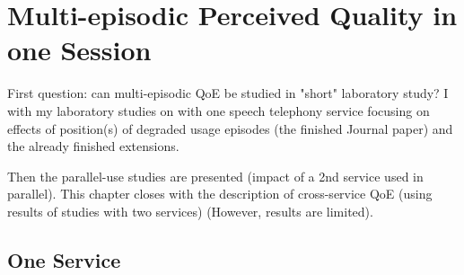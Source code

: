 \chapter{Multi-episodic Perceived Quality in one Session}\label{chap:lab}
\begin{chapter-abstract}
First question: can multi-episodic QoE be studied in "short" laboratory study?
I with my laboratory studies on with one speech telephony service focusing on effects of position(s) of degraded usage episodes (the finished Journal paper) and the already finished extensions.

Then the parallel-use studies are presented (impact of a 2nd service used in parallel).
This chapter closes with the description of cross-service QoE (using results of studies with two services) (However, results are limited).
\end{chapter-abstract}



\section{One Service}


